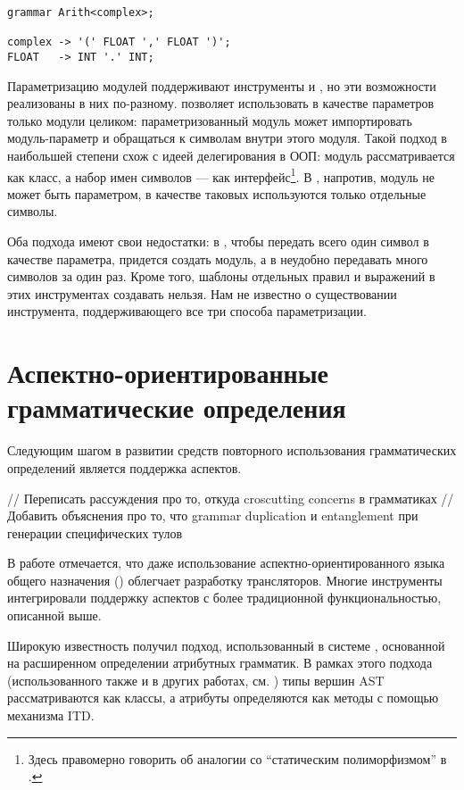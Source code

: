 \begin{lstlisting}
grammar Arith<complex>;

complex -> '(' FLOAT ',' FLOAT ')';
FLOAT   -> INT '.' INT;
\end{lstlisting}

Параметризацию модулей поддерживают инструменты  и , но эти возможности реализованы в них по-разному.  позволяет использовать в качестве параметров только модули целиком: параметризованный модуль может импортировать модуль-параметр и обращаться к символам внутри этого модуля. Такой подход в наибольшей степени схож с идеей делегирования в ООП: модуль рассматривается как класс, а набор имен символов --- как интерфейс\footnote{Здесь правомерно говорить об аналогии со ``статическим полиморфизмом'' в  \cite{???}.}. В , напротив, модуль не может быть параметром, в качестве таковых используются только отдельные символы. 

Оба подхода имеют свои недостатки: в , чтобы передать всего один символ в качестве параметра, придется создать модуль, а в  неудобно передавать много символов за один раз. Кроме того, шаблоны отдельных правил и выражений в этих инструментах создавать нельзя. Нам не известно о существовании инструмента, поддерживающего все три способа параметризации.
	
\section{Аспектно-ориентированные грамматические определения}

Следующим шагом в развитии средств повторного использования грамматических определений является поддержка аспектов.

// Переписать рассуждения про то, откуда croscutting concerns в грамматиках
// Добавить объяснения про то, что grammar duplication и entanglement при генерации специфических тулов

В работе \cite{???} отмечается, что даже использование аспектно-ориентированного языка общего назначения () облегчает разработку трансляторов. Многие инструменты интегрировали поддержку аспектов с более традиционной функциональностью, описанной выше.

Широкую известность получил подход, использованный в системе  \cite{???}, основанной на расширенном определении атрибутных грамматик. В рамках этого подхода (использованного также и в других работах, см. \cite{???}) типы вершин AST рассматриваются как классы, а атрибуты определяются как методы с помощью механизма ITD.

